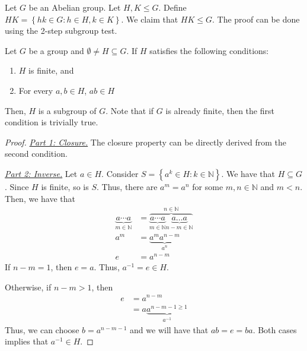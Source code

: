 \begin{nexample}
    Let \(G\) be an Abelian group. Let \(H, K \leq G\). Define \(HK = \left\{hk \in G : h \in H, k \in K\right\}\). We claim that \(HK \leq G\). The proof can be done using the 2-step subgroup test.
\end{nexample}

\begin{theorem}
    Let \(G\) be a group and \(\emptyset \neq H \subseteq G\). If \(H\) satisfies the following conditions:
    \begin{enumerate}
        \item \(H\) is finite, and
        \item For every \(a, b \in H\), \(ab \in H\)
    \end{enumerate}
    Then, \(H\) is a subgroup of \(G\). Note that if \(G\) is already finite, then the first condition is trivially true.
\end{theorem}

\begin{proof}
    \phantom{help}

    \underline{\textit{Part 1: Closure.}} The closure property can be directly derived from the second condition.

    \underline{\textit{Part 2: Inverse.}} Let \(a \in H\). Consider \(S = \left\{a^k \in H : k \in \mathbb{N}\right\}\). We have that \(H \subseteq G\). Since \(H\) is finite, so is \(S\). Thus, there are \(a^m = a^n\) for some \(m, n \in \mathbb{N}\) and \(m < n\). Then, we have that
    \[
    \begin{aligned}
        \underbrace{a \cdots a}_{m \in \mathbb{N}}
            &= \overbrace{\underbrace{a \cdots a}_{m \in \mathbb{N}}\underbrace{a \dots a}_{n-m \in \mathbb{N}}}^{n \in \mathbb{N}} \\
        a^m &= \underbrace{a^m a^{n-m}}_{a^n} \\
        e &= a^{n-m}
    \end{aligned}
    \]
    If \(n-m = 1\), then \(e = a\). Thus, \(a^{-1} = e \in H\).

    Otherwise, if \(n-m > 1\), then
    \[
    \begin{aligned}
        e &= a^{n-m} \\
          &= a\underbrace{a^{n-m-1 \geq 1}}_{a^{-1}}
    \end{aligned}
    \]
    Thus, we can choose \(b = a^{n-m-1}\) and we will have that \(ab = e = ba\). Both cases implies that \(a^{-1} \in H\).
\end{proof}

